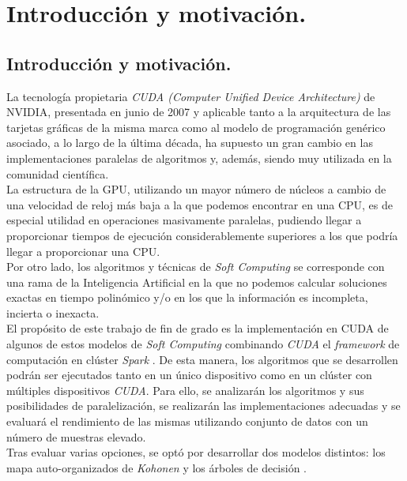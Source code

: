 \documentclass[a4paper,oneside,11pt,titlepage]{book}
\begin{document}

  
\frontmatter
\tableofcontents
\listoffigures
\listoftables

%
\mainmatter
\setlength{\parskip}{5pt}
\chapter{Introducción y motivación.}
\section{Introducción y motivación.}
La tecnología propietaria \textit{CUDA (Computer Unified Device Architecture)} \cite{cuda} de NVIDIA, presentada en junio de 2007 y aplicable tanto a la arquitectura de las tarjetas gráficas de la misma marca como al modelo de programación genérico asociado, a lo largo de la última década, ha supuesto un gran cambio en las implementaciones paralelas de algoritmos y, además, siendo muy utilizada en la comunidad científica.\\

La estructura de la GPU, utilizando un mayor número de núcleos a cambio de una velocidad de reloj más baja a la que podemos encontrar en una CPU, es de especial utilidad en operaciones masivamente paralelas, pudiendo llegar a proporcionar tiempos de ejecución considerablemente superiores a los que podría llegar a proporcionar una CPU.\\

Por otro lado, los algoritmos y técnicas de \textit{Soft Computing} se corresponde con una rama de la Inteligencia Artificial en la que no podemos calcular soluciones exactas en tiempo polinómico y/o en los que la información es incompleta, incierta o inexacta.\\

El propósito de este trabajo de fin de grado es la implementación en CUDA de algunos de estos modelos de \textit{Soft Computing} combinando \textit{CUDA} el \textit{framework} de computación en clúster \textit{Spark} \cite{spark}. De esta manera, los algoritmos que se desarrollen podrán ser ejecutados tanto en un único dispositivo como en un clúster con múltiples dispositivos \textit{CUDA}. Para ello, se analizarán los algoritmos y sus posibilidades de paralelización, se realizarán las implementaciones adecuadas y se evaluará el rendimiento de las mismas utilizando conjunto de datos con un número de muestras elevado.\\

Tras evaluar varias opciones, se optó por desarrollar dos modelos distintos: los mapa auto-organizados de \textit{Kohonen} \cite{kohonensom} y los árboles de decisión \cite{arbol}.\\
\end{document}

